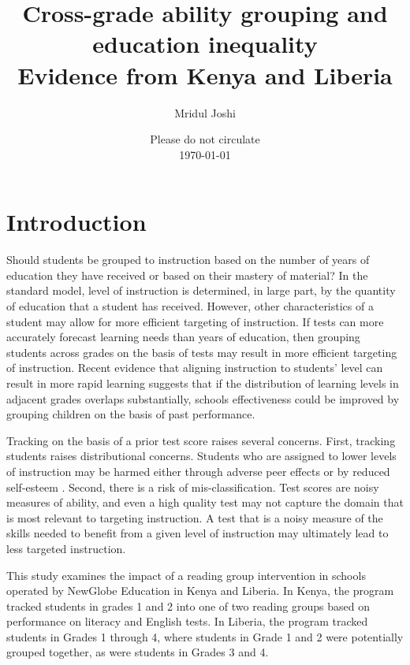 \documentclass[11pt]{article}
\title{Cross-grade ability grouping and education inequality \\ Evidence from Kenya and Liberia}
\begin{document}
\author{Mridul Joshi}
\date{Please do not circulate \\ \today}

\maketitle
\doublespacing

\section{Introduction}

Should students be grouped to instruction based on the number of years of education they have received or based on their mastery of material? In the standard model, level of instruction is determined, in large part, by the quantity of education that a student has received. However, other characteristics of a student may allow for more efficient targeting of instruction. If tests can more accurately forecast learning needs than years of education, then grouping students across grades on the basis of tests may result in more efficient targeting of instruction. Recent evidence that aligning instruction to students' level can result in more rapid learning \citep{banerjee/cole/duflo/linden:2007,duflodupaskremer,banerjee2017proof,duflo2020experimental,muralidharan2019disrupting} suggests that if the distribution of learning levels in adjacent grades overlaps substantially, schools effectiveness could be improved by grouping children on the basis of past performance. 

Tracking on the basis of a prior test score raises several concerns. First, tracking students raises distributional concerns. Students who are assigned to lower levels of instruction may be harmed either through adverse peer effects or by reduced self-esteem \citep{betts:2011}. Second, there is a risk of mis-classification. Test scores are noisy measures of ability, and even a high quality test may not capture the domain that is most relevant to targeting instruction. A test that is a noisy measure of the skills needed to benefit from a given level of instruction may ultimately lead to less targeted instruction. 

This study examines the impact of a reading group intervention in schools operated by NewGlobe Education in Kenya and Liberia. In Kenya, the program tracked students in grades 1 and 2 into one of two reading groups based on performance on literacy and English tests. In Liberia, the program tracked students in Grades 1 through 4, where students in Grade 1 and 2 were potentially grouped together, as were students in Grades 3 and 4.
\end{document}
